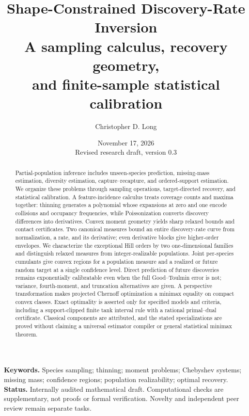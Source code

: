 \documentclass[11pt]{article}
\title{\textbf{Shape-Constrained Discovery-Rate Inversion}\\[5pt]
\large A sampling calculus, recovery geometry,\\and finite-sample statistical calibration}
\author{Christopher D. Long}
\date{November 17, 2026\\[3pt]\small Revised research draft, version 0.3}
\numberwithin{equation}{section}
\theoremstyle{definition}
\theoremstyle{remark}
\begin{document}
\maketitle
\begin{abstract}
Partial-population inference includes unseen-species prediction, missing-mass estimation, diversity estimation, capture--recapture, and ordered-support estimation. We organize these problems through sampling operations, target-directed recovery, and statistical calibration. A feature-incidence calculus treats coverage counts and maxima together: thinning generates a polynomial whose expansions at zero and one encode collisions and occupancy frequencies, while Poissonization converts discovery differences into derivatives. Convex moment geometry yields sharp relaxed bounds and contact certificates. Two canonical measures bound an entire discovery-rate curve from normalization, a rate, and its derivative; even derivative blocks give higher-order envelopes. We characterize the exceptional Hill orders by two one-dimensional families and distinguish relaxed measures from integer-realizable populations. Joint per-species cumulants give convex regions for a population measure and a realized or future random target at a single confidence level. Direct prediction of future discoveries remains exponentially calibratable even when the full Good--Toulmin error is not; variance, fourth-moment, and truncation alternatives are given. A perspective transformation makes projected Chernoff optimization a minimax equality on compact convex classes. Exact optimality is asserted only for specified models and criteria, including a support-clipped finite tank interval rule with a rational primal--dual certificate. Classical components are attributed, and the stated specializations are proved without claiming a universal estimator compiler or general statistical minimax theorem.
\end{abstract}
\noindent\textbf{Keywords.} Species sampling; thinning; moment problems; Chebyshev systems; missing mass; confidence regions; population realizability; optimal recovery.
\medskip
\noindent\textbf{Status.} Internally audited mathematical draft. Computational checks are supplementary, not proofs or formal verification. Novelty and independent peer review remain separate tasks.
\clearpage
\begingroup\footnotesize
\tableofcontents
\endgroup
\clearpage
\end{document}
